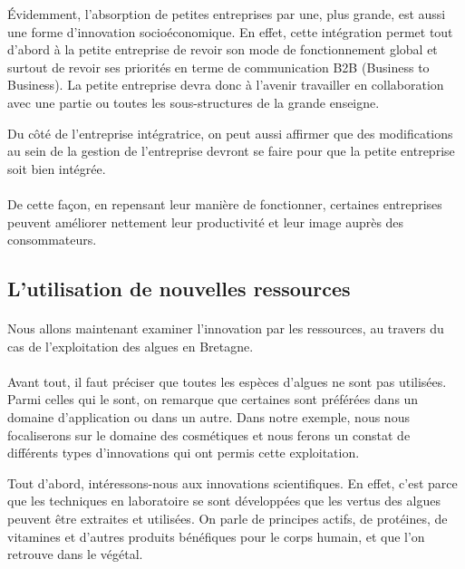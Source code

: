 \documentclass[a4paper,12pt]{report}
\begin{document}
			Évidemment, l’absorption de petites entreprises par une, plus grande, est aussi une forme d’innovation socioéconomique. En effet, cette intégration permet tout d’abord à la petite entreprise de revoir son mode de fonctionnement global et surtout de revoir ses priorités en terme de communication B2B (Business to Business). La petite entreprise devra donc à l’avenir travailler en collaboration avec une partie ou toutes les sous-structures de la grande enseigne.

			Du côté de l’entreprise intégratrice, on peut aussi affirmer que des modifications au sein de la gestion de l’entreprise devront se faire pour que la petite entreprise soit bien intégrée. 
			
			\paragraph{}De cette façon, en repensant leur manière de fonctionner, certaines entreprises peuvent améliorer nettement leur productivité et leur image auprès des consommateurs.
			
			
				
		\subsection{L'utilisation de nouvelles ressources}
			\paragraph{}Nous allons maintenant examiner l'innovation par les ressources, au travers du cas de l’exploitation des algues en Bretagne.

			\paragraph{}Avant tout, il faut préciser que toutes les espèces d’algues ne sont pas utilisées. Parmi celles qui le sont, on remarque que certaines sont préférées dans un domaine d’application ou dans un autre. Dans notre exemple, nous nous focaliserons sur le domaine des cosmétiques et nous ferons un constat de différents types d’innovations qui ont permis cette exploitation.
			
			Tout d’abord, intéressons-nous aux innovations scientifiques. En effet, c’est parce que les techniques en laboratoire se sont développées que les vertus des algues peuvent être extraites et utilisées. On parle de principes actifs, de protéines, de vitamines et d’autres produits bénéfiques pour le corps humain, et que l’on retrouve dans le végétal.
			
\end{document}
